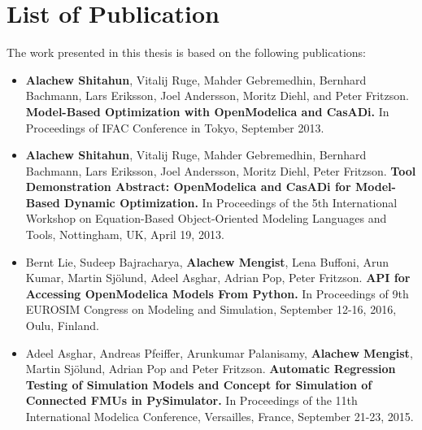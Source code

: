 \section{List of Publication}
\label{sec:List of Publication}


The work presented in this thesis is based on the following publications:


\begin{itemize}
	
\item[\begin{NoHyper} \cite{alachewoptimization} \end{NoHyper} ] \textbf{Alachew Shitahun}, Vitalij Ruge, Mahder Gebremedhin, Bernhard Bachmann, Lars Eriksson, Joel Andersson, Moritz Diehl, and Peter Fritzson. \textbf{Model-Based Optimization with OpenModelica and CasADi.} In Proceedings of IFAC Conference in Tokyo, September 2013. 

\item[\begin{NoHyper} \cite{alachewoptimizationdemo} \end{NoHyper}] \textbf{Alachew Shitahun}, Vitalij Ruge, Mahder Gebremedhin, Bernhard Bachmann, Lars Eriksson, Joel Andersson, Moritz Diehl, Peter Fritzson. \textbf{Tool Demonstration Abstract: OpenModelica and CasADi for Model-Based Dynamic Optimization.} In Proceedings of the 5th International Workshop on Equation-Based Object-Oriented Modeling Languages and Tools, Nottingham, UK, April 19, 2013. 

\item[ \begin{NoHyper} \cite{alachewompython} \end{NoHyper}] Bernt Lie, Sudeep Bajracharya, \textbf{Alachew Mengist}, Lena Buffoni, Arun Kumar, Martin Sj\"{o}lund, Adeel Asghar, Adrian Pop, Peter Fritzson.\textbf{ API for Accessing OpenModelica Models From Python.} In Proceedings of 9th EUROSIM Congress on Modeling and Simulation, September 12-16, 2016, Oulu, Finland. 

\item[\begin{NoHyper} \cite{alachewpysimulator} \end{NoHyper}] Adeel Asghar, Andreas Pfeiffer, Arunkumar Palanisamy, \textbf{Alachew Mengist}, Martin Sj\"{o}lund, Adrian Pop and Peter Fritzson.\textbf{ Automatic Regression Testing of Simulation Models and Concept for Simulation of Connected FMUs in PySimulator.} In Proceedings of the 11th International Modelica Conference, Versailles, France, September 21-23, 2015. 


\end{itemize}
